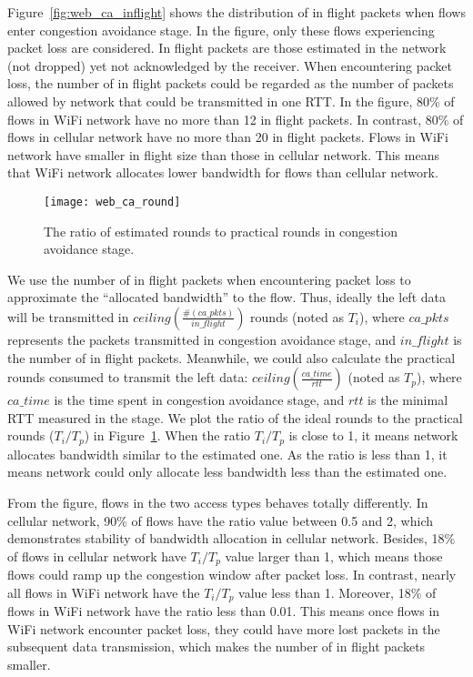 Figure~\ref{fig:web_ca_inflight} shows the distribution of in flight packets when flows enter congestion avoidance stage. In the figure, only these flows experiencing packet loss are considered. In flight packets are those estimated in the network (\ie not dropped) yet not acknowledged by the receiver. When encountering packet loss, the number of in flight packets could be regarded as the number of packets allowed by network that could be transmitted in one RTT. In the figure, 80\% of flows in WiFi network have no more than 12 in flight packets. In contrast, 80\% of flows in cellular network have no more than 20 in flight packets. Flows in WiFi network have smaller in flight size than those in cellular network. This means that WiFi network allocates lower bandwidth for flows than cellular network.

\begin{figure}[th]
\centering
\texttt{[image: web\_ca\_round]}
\caption{The ratio of estimated rounds to practical rounds in congestion avoidance stage.}
\label{fig:web_ca_round}
\end{figure}

We use the number of in flight packets when encountering packet loss to approximate the ``allocated bandwidth'' to the flow. Thus, ideally the left data will be transmitted in $ceiling(\frac{\#(ca\_pkts)}{in\_flight})$ rounds (noted as $T_i$), where $ca\_pkts$ represents the packets transmitted in congestion avoidance stage, and $in\_flight$ is the number of in flight packets. Meanwhile, we could also calculate the practical rounds consumed to transmit the left data: $ceiling(\frac{ca\_time}{rtt})$ (noted as $T_p$), where $ca\_time$ is the time spent in congestion avoidance stage, and $rtt$ is the minimal RTT measured in the stage. We plot the ratio of the ideal rounds to the practical rounds (\ie $T_i/T_p$) in Figure~\ref{fig:web_ca_round}. When the ratio $T_i/T_p$ is close to 1, it means network allocates bandwidth similar to the estimated one. As the ratio is less than 1, it means network could only allocate less bandwidth less than the estimated one. 

From the figure, flows in the two access types behaves totally differently. In cellular network, 90\% of flows have the ratio value between 0.5 and 2, which demonstrates stability of bandwidth allocation in cellular network. Besides, 18\% of flows in cellular network have $T_i/T_p$ value larger than 1, which means those flows could ramp up the congestion window after packet loss. In contrast, nearly all flows in WiFi network have the $T_i/T_p$ value less than 1. Moreover, 18\% of flows in WiFi network have the ratio less than 0.01. This means once flows in WiFi network encounter packet loss, they could have more lost packets in the subsequent data transmission, which makes the number of in flight packets smaller.

